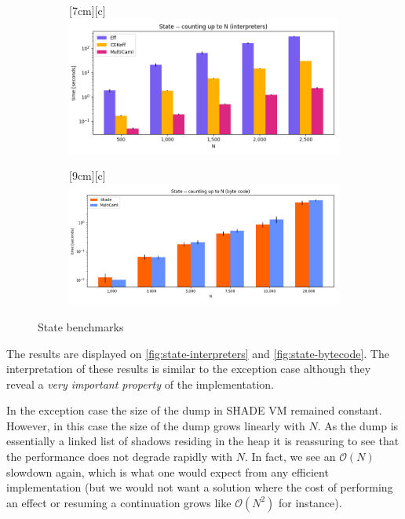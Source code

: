 \documentclass[class=article, crop=false]{standalone}
\begin{document}
\begin{figure}
\begin{subfigure}{.5\textwidth}
    \centering
    [7cm][c]
    {\includegraphics[width=\linewidth]{eval_plots/interp_state.png}}
    \label{fig:state-interpreters}
\end{subfigure}
\begin{subfigure}{.5\textwidth}
    \centering
    [9cm][c]
    {\includegraphics[width=\linewidth]{eval_plots/comp_state.png}}
    \label{fig:state-bytecode}
\end{subfigure}

\caption{State benchmarks}
\label{fig:state-benchmarks}
\end{figure}

The results are displayed on \autoref{fig:state-interpreters} and
\autoref{fig:state-bytecode}. The interpretation of these results is similar to
the exception case although they reveal a \emph{very important property} of the implementation.

In the exception case the size of the dump in SHADE VM remained constant.
However, in this case the size of the dump grows
linearly with $N$. As the dump is essentially a linked list of shadows residing
in the heap it is reassuring to see that the performance does not degrade
rapidly with $N$. In fact, we see an $\mathcal{O}(N)$ slowdown again, which is
what one would expect from any efficient implementation (but we would not want a
solution where the cost of performing an effect or resuming a continuation grows
like $\mathcal{O}(N^2)$ for instance).
\end{document}
